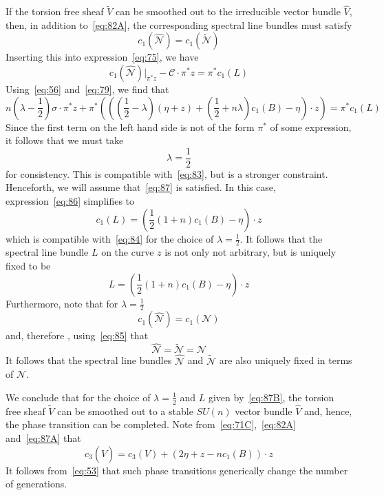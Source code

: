 \documentclass[a4paper,12pt]{article}
\numberwithin{equation}{section}
\def\cC{{\mathcal C}}
\def\cN{{\mathcal N}}
\theoremstyle{plain}
\begin{document}
If the torsion free sheaf $\widetilde{V}$ can be smoothed out to the 
irreducible vector bundle ${\widehat{V}}$, then, 
in addition to~\eqref{eq:82A}, 
the corresponding spectral line bundles must satisfy
\begin{equation}
c_{1}(\widehat{\cN})=c_{1}(\widetilde{\cN})
\label{eq:85}
\end{equation}
Inserting this into expression~\eqref{eq:75}, we have
\begin{equation}
c_{1}(\widehat{\cN})|_{\pi^{*}z} -\cC \cdot \pi^{*}z= \pi^{*}c_{1}(L)
\label{eq:85A}
\end{equation}
Using~\eqref{eq:56} and~\eqref{eq:79}, we find that 
\begin{equation}
n(\lambda-\frac{1}{2})\sigma \cdot \pi^{*}z +\pi^{*}\left(((\frac{1}{2}-
\lambda)(\eta+z)+ (\frac{1}{2}+ n\lambda)c_{1}(B)-\eta) \cdot z \right)=
\pi^{*}c_{1}(L)
\label{eq:86}
\end{equation}
Since the first term on the left hand side is not of the form $\pi^{*}$ of
some expression, it follows that we must take
\begin{equation}
\lambda= \frac{1}{2}
\label{eq:87}
\end{equation}
for consistency. This is compatible with~\eqref{eq:83}, but is a stronger
constraint. Henceforth, we will assume that~\eqref{eq:87} is satisfied. 
In this case, expression~\eqref{eq:86} simplifies to
\begin{equation}
c_{1}(L)=(\frac{1}{2}(1+n)c_{1}(B)-\eta) \cdot z
\label{eq:87A}
\end{equation}
which is compatible with~\eqref{eq:84} for the choice of
$\lambda=\frac{1}{2}$. It follows that the spectral line bundle $L$ on the
curve $z$ is not only not arbitrary, but is uniquely fixed to be
\begin{equation}
L=(\frac{1}{2}(1+n)c_{1}(B)-\eta) \cdot z
\label{eq:87B}
\end{equation}
Furthermore, note that for $\lambda= \frac{1}{2}$
\begin{equation}
c_{1}(\widehat{\cN})=c_{1}(\cN)
\label{eq:88}
\end{equation}
and, therefore   , using~\eqref{eq:85} that
\begin{equation}
\widehat{\cN}=\widetilde{\cN}=\cN
\label{eq:89}
\end{equation}
It follows that the spectral line bundles $\widehat{\cN}$ and
$\widetilde{\cN}$  are
also uniquely fixed in terms of $\cN$. 

We conclude that for the choice of $\lambda=\frac{1}{2}$ and $L$ given
by~\eqref{eq:87B}, the torsion free sheaf $\widetilde{V}$ can be smoothed out to
a stable $SU(n)$ vector bundle $\widehat{V}$ and, hence, the phase
transition can be completed. Note from~\eqref{eq:71C},~\eqref{eq:82A}
and~\eqref{eq:87A} that
\begin{equation}
c_{3}(\widehat{V})=c_{3}(V)+ (2\eta+z-nc_{1}(B))\cdot z
\label{eq:90}
\end{equation}
It follows from~\eqref{eq:53} that such phase transitions generically change
the number of generations.
\end{document}
